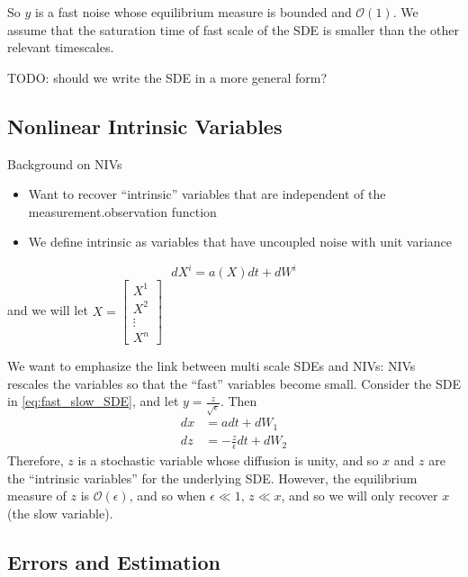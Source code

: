 \documentclass[1p]{elsarticle}
\begin{document}
So $y$ is a fast noise whose equilibrium measure is bounded and $\mathcal{O}(1)$.
%
We assume that the saturation time of fast scale  of the SDE is smaller than the other relevant timescales.

TODO: should we write the SDE in a more general form?

\subsection{Nonlinear Intrinsic Variables}

Background on NIVs 	
\begin{itemize}

\item Want to recover ``intrinsic'' variables that are independent of the measurement.observation function
\item We define intrinsic as variables that have uncoupled noise with unit variance
\end{itemize}

\begin{equation}
dX^i = a(X) dt + dW^i
\end{equation}
and we will let $X = \begin{bmatrix} X^1 \\ X^2 \\ \vdots \\ X^n \end{bmatrix}$

We want to emphasize the link between multi scale SDEs and NIVs: NIVs rescales the variables so that the ``fast'' variables become small.
%
Consider the SDE in \eqref{eq:fast_slow_SDE}, and let $y = \frac{z}{\sqrt{\epsilon}}$. 
%
Then
\begin{equation}
\begin{aligned}
dx &= adt + dW_1\\
dz &= -\frac{z}{\epsilon} dt +  dW_2
\end{aligned}
\end{equation}
%
Therefore, $z$ is a stochastic variable whose diffusion is unity, and so $x$ and $z$ are the ``intrinsic variables'' for the underlying SDE.
%
However, the equilibrium measure of $z$ is $\mathcal{O}(\epsilon)$, and so when $\epsilon \ll 1$, $z \ll x$, and so we will only recover $x$ (the slow variable). 

\subsection{Errors and Estimation}
\end{document}
